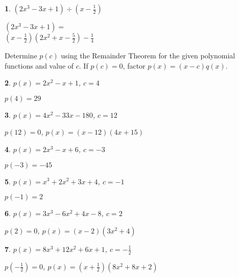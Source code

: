 \documentclass{amsbook}
\newtheorem{exc}{}
\newenvironment{ex}{\begin{exc}\normalfont}{\end{exc}}
\numberwithin{section}{chapter}
\numberwithin{equation}{chapter}
\begin{document}
\begin{multicols}{2}
\begin{ex}
	$\left(2x^3 - 3x +1 \right) \div \left(x - \frac{1}{2} \right)$
	\begin{sol}
		$\left(2x^3 - 3x +1 \right) = $\\
		$\left(x - \frac{1}{2} \right) \left(2x^2+x-\frac{5}{2}\right)-\frac{1}{4}$
	\end{sol}
\end{ex}

\end{multicols}


Determine $p(c)$ using the Remainder Theorem for the given polynomial functions and value of $c$.  If $p(c) = 0$, factor $p(x) = (x-c) q(x)$.

\begin{multicols}{2}
	
\begin{ex}
	$p(x) = 2x^2 - x + 1$, $c = 4$ 
	\begin{sol}
		$p(4) = 29$
	\end{sol}
\end{ex}

\begin{ex}
	$p(x) = 4x^2-33x-180$, $c = 12$
	\begin{sol}
		$p(12) =0$, $p(x) = (x-12)(4x+15)$
	\end{sol}
\end{ex}

\begin{ex}
	$p(x) = 2x^3 - x + 6$, $c=-3$
	\begin{sol}
		$p(-3)=-45$
	\end{sol}
\end{ex}

\begin{ex}
	$p(x) = x^3+2x^2+3x+4$, $c =-1$
	\begin{sol}
		$p(-1)=2$
	\end{sol}
\end{ex}
	
\begin{ex}
	 $p(x) =3x^3-6x^2+4x-8$, $c=2$
	\begin{sol}
		$p(2) =0$, $p(x)= (x-2) \left(3x^2+4\right)$
	\end{sol}
\end{ex}

\begin{ex}
	$p(x) = 8x^3+12x^2+6x+1$, $c =-\frac{1}{2}$
	\begin{sol}
		$p\left(-\frac{1}{2}\right) = 0$, $p(x)  = \left(x+\frac{1}{2}\right)\left(8x^2+8x+2\right)$
	\end{sol}
\end{ex}
\end{multicols}
\end{document}

